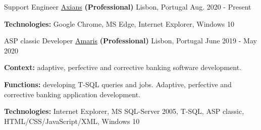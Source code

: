 \begin{cventries}

\vspace{-0.25cm}

  \cventry
    {Support Engineer} %
    {\href{https://www.axians.pt/pt/}{Axians} \textbf{(Professional)}} %
    {Lisbon, Portugal} %
    {Aug. 2020 - Present} %
    {
      \begin{cvitems} %
		\item[] {\textbf{Technologies:} 
		\textcolor{rainbowcolor-olive}{Google Chrome}, 
		\textcolor{rainbowcolor-olive}{MS Edge}, 
		\textcolor{rainbowcolor-olive}{Internet Explorer}, 
		\textcolor{rainbowcolor-orange}{Windows 10}}			
      \end{cvitems}		
    } 

  \cventry
    {ASP classic Developer} %
    {\href{https://www.amaris.com/}{Amaris} \textbf{(Professional)}} %
    {Lisbon, Portugal} %
    {June 2019 - May 2020} %
    {
      \begin{cvitems} %
		\item[] {\textbf{Context:} adaptive, perfective and corrective banking software development. 
}
		\item[] {\textbf{Functions:} developing T-SQL queries and jobs. Adaptive, perfective and corrective banking application development.}		
		\item[] {\textbf{Technologies:} 
		\textcolor{rainbowcolor-olive}{Internet Explorer}, 
		\textcolor{rainbowcolor-olive}{MS SQL-Server 2005}, 
		\textcolor{rainbowcolor-indigo}{T-SQL}, 
		\textcolor{rainbowcolor-indigo}{ASP classic}, 
		\textcolor{rainbowcolor-indigo}{HTML/CSS/JavaScript/XML}, 
		\textcolor{rainbowcolor-orange}{Windows 10}}		
      \end{cvitems}
    } 
    

\end{cventries}
